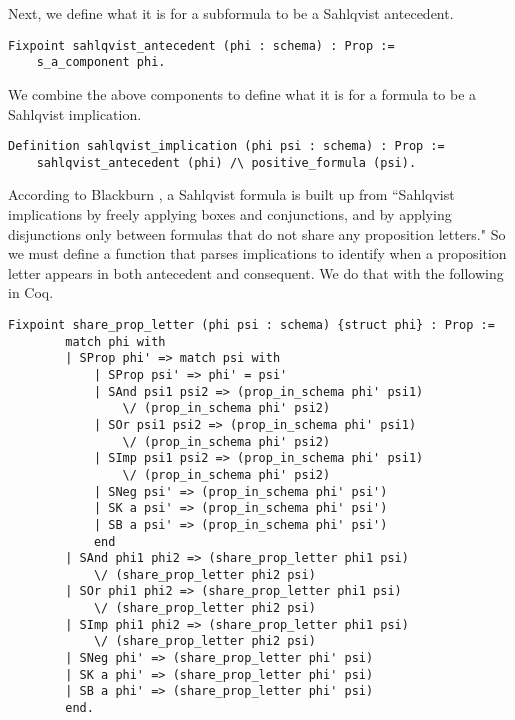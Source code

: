 Next, we define what it is for a subformula to be a Sahlqvist antecedent.

\begin{tcolorbox}
\begin{lstlisting}[language=Coq]
Fixpoint sahlqvist_antecedent (phi : schema) : Prop :=
	s_a_component phi.
\end{lstlisting}
\end{tcolorbox}

We combine the above components to define what it is for a formula to be a Sahlqvist implication.

\begin{tcolorbox}
	\begin{lstlisting}[language=Coq]
Definition sahlqvist_implication (phi psi : schema) : Prop :=
	sahlqvist_antecedent (phi) /\ positive_formula (psi).

\end{lstlisting}
\end{tcolorbox}

According to Blackburn \etal\cite{modal}, a Sahlqvist formula is built up from ``Sahlqvist implications by freely applying boxes and conjunctions, and by applying disjunctions only between formulas that do not share any proposition letters." So we must define a function that parses implications to identify when a proposition letter appears in both antecedent and consequent. We do that with the following in Coq.

\begin{tcolorbox}
	\begin{lstlisting}[language=Coq]
	Fixpoint share_prop_letter (phi psi : schema) {struct phi} : Prop :=
		match phi with
		| SProp phi' => match psi with
			| SProp psi' => phi' = psi'
			| SAnd psi1 psi2 => (prop_in_schema phi' psi1)
			 	\/ (prop_in_schema phi' psi2)
			| SOr psi1 psi2 => (prop_in_schema phi' psi1) 
				\/ (prop_in_schema phi' psi2)
			| SImp psi1 psi2 => (prop_in_schema phi' psi1) 
				\/ (prop_in_schema phi' psi2)
			| SNeg psi' => (prop_in_schema phi' psi')
			| SK a psi' => (prop_in_schema phi' psi')
			| SB a psi' => (prop_in_schema phi' psi')
			end
		| SAnd phi1 phi2 => (share_prop_letter phi1 psi) 
			\/ (share_prop_letter phi2 psi)
		| SOr phi1 phi2 => (share_prop_letter phi1 psi) 
			\/ (share_prop_letter phi2 psi)
		| SImp phi1 phi2 => (share_prop_letter phi1 psi) 
			\/ (share_prop_letter phi2 psi)
		| SNeg phi' => (share_prop_letter phi' psi)
		| SK a phi' => (share_prop_letter phi' psi)
		| SB a phi' => (share_prop_letter phi' psi)
		end.
	\end{lstlisting}
\end{tcolorbox}


